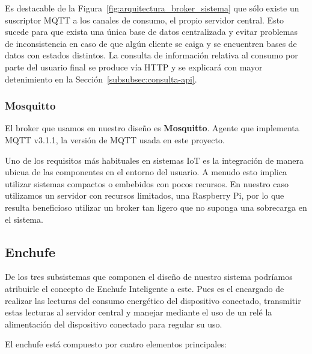 \documentclass[a4paper,10pt]{article}
\begin{document}
Es destacable de la Figura~\ref{fig:arquitectura_broker_sistema} que
sólo existe un suscriptor MQTT a los canales de consumo, el propio
servidor central. Esto sucede para que exista una única base de datos
centralizada y evitar problemas de inconsistencia en caso de que algún
cliente se caiga y se encuentren bases de datos con estados
distintos. La consulta de información relativa al consumo por parte
del usuario final se produce vía HTTP y se explicará con mayor
detenimiento en la Sección~\ref{subsubsec:consulta-api}.


\newpage

\subsubsection{Mosquitto}\label{subsubsec:broker_mosquitto}

El broker que usamos en nuestro diseño es
\textbf{Mosquitto}\cite{EclipseMosquitto}. Agente que implementa MQTT
v3.1.1, la versión de MQTT usada en este proyecto.

Uno de los requisitos más habituales en sistemas IoT es la integración
de manera ubicua de las componentes en el entorno del usuario. A
menudo esto implica utilizar sistemas compactos o embebidos con pocos
recursos. En nuestro caso utilizamos un servidor con recursos
limitados, una Raspberry Pi, por lo que resulta beneficioso utilizar
un broker tan ligero que no suponga una sobrecarga en el sistema.

\newpage

\subsection{Enchufe}\label{subsec:enchufe}

De los tres subsistemas que componen el diseño de nuestro sistema
podríamos atribuirle el concepto de Enchufe Inteligente a este. Pues
es el encargado de realizar las lecturas del consumo energético del
dispositivo conectado, transmitir estas lecturas al servidor central y
manejar mediante el uso de un relé la alimentación del dispositivo
conectado para regular su uso.

El enchufe está compuesto por cuatro elementos principales:
\end{document}
